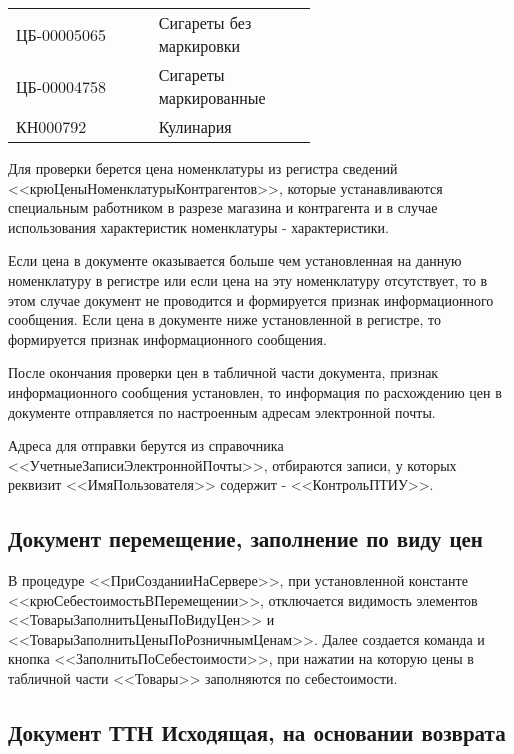 \vspace{\baselineskip}
\begin{tabular}{p{0.3\linewidth}p{0.3\linewidth}}

	\toprule   
	ЦБ-00005065 & Сигареты без маркировки \\
	ЦБ-00004758 & Сигареты маркированные \\

	КН000792 & Кулинария \\
	\bottomrule %
\end{tabular}
\vspace{\baselineskip}\par
Для проверки берется цена номенклатуры из регистра сведений <<крюЦеныНоменклатурыКонтрагентов>>,
которые устанавливаются специальным работником в разрезе магазина и контрагента и в случае использования характеристик номенклатуры - характеристики.\par
Если цена в документе оказывается больше чем установленная на данную номенклатуру в регистре или если цена на эту номенклатуру отсутствует, то в этом случае документ не проводится и формируется признак информационного сообщения. Если цена в документе ниже установленной в регистре, то формируется признак информационного сообщения.\par
После окончания проверки цен в табличной части документа, признак информационного  сообщения установлен, то информация по расхождению цен в документе отправляется по настроенным адресам электронной почты.\par
Адреса для отправки берутся из справочника <<УчетныеЗаписиЭлектроннойПочты>>, отбираются записи, у которых реквизит  <<ИмяПользователя>> содержит - <<КонтрольПТИУ>>.


\subsection{Документ перемещение, заполнение по виду цен}\label{1007}	 

В процедуре <<ПриСозданииНаСервере>>, при установленной константе <<крюСебестоимостьВПеремещении>>, отключается видимость элементов <<ТоварыЗаполнитьЦеныПоВидуЦен>> и <<ТоварыЗаполнитьЦеныПоРозничнымЦенам>>.
Далее создается команда и кнопка <<ЗаполнитьПоСебестоимости>>, при нажатии на которую цены в табличной части <<Товары>> заполняются по себестоимости.


\subsection{Документ ТТН Исходящая, на основании возврата}\label{1008}	 

